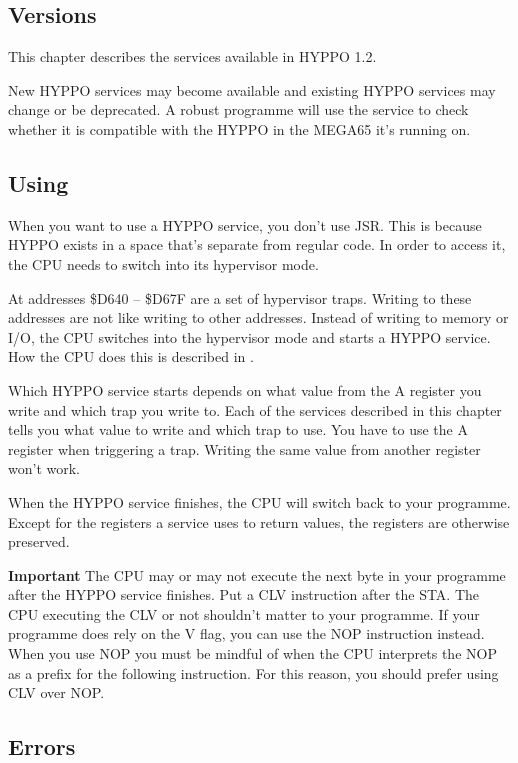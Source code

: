 \filbreak
\subsection{Versions}

This chapter describes the services available in HYPPO 1.2.

New HYPPO services may become available and existing HYPPO services may change
or be deprecated. A robust programme will use the 
service to check whether it is compatible with the HYPPO in the MEGA65 it's
running on.


\subsection{Using}
When you want to use a HYPPO service, you don't use JSR. This is because
HYPPO exists in a space that's separate from regular code. In order to
access it, the CPU needs to switch into its hypervisor mode.

At addresses \$D640 -- \$D67F are a set of hypervisor traps. Writing to these
addresses are not like writing to other addresses. Instead of writing to memory
or I/O, the CPU switches into the hypervisor mode and starts a HYPPO service.
How the CPU does this is described in .

Which HYPPO service starts depends on what value from the A register you
write and which trap you write to. Each of the services described in this
chapter tells you what value to write and which trap to use. You have to use the
A register when triggering a trap. Writing the same value from another register
won't work.

When the HYPPO service finishes, the CPU will switch back to your programme.
Except for the registers a service uses to return values, the registers are
otherwise preserved.

\textbf{Important} The CPU may or may not execute the next byte in your
programme after the HYPPO service finishes. Put a CLV instruction after the STA.
The CPU executing the CLV or not shouldn't matter to your programme. If your
programme does rely on the V flag, you can use the NOP instruction instead. When
you use NOP you must be mindful of when the CPU interprets the NOP as a prefix
for the following instruction. For this reason, you should prefer using CLV
over NOP.

\subsection{Errors}

